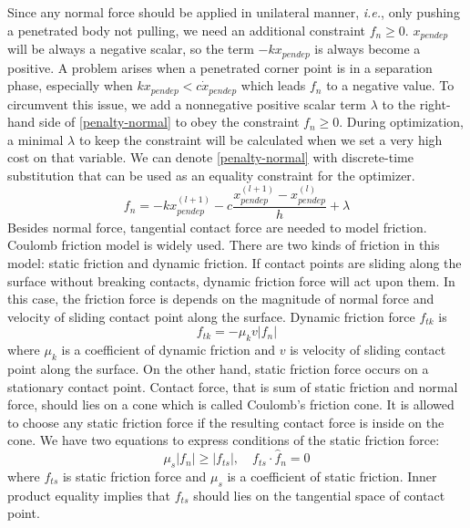 \documentclass{acm_proc_article-sp}
\begin{document}
Since any normal force should be applied in unilateral manner, \emph{i.e.},
only pushing a penetrated body not pulling, we need an additional constraint $f_n \geq 0$.
$x_{pendep}$ will be always a negative scalar, so the term $-kx_{pendep}$ is always become a positive.
A problem arises when a penetrated corner point is in a separation phase,
especially when $kx_{pendep} < c\dot{x}_{pendep}$ which leads $f_n$ to a negative value.
To circumvent this issue, we add a nonnegative positive scalar term $\lambda$ to the right-hand side
of \eqref{penalty-normal} to obey the constraint $f_n \geq 0$. During optimization,
a minimal $\lambda$ to keep the constraint will be calculated
when we set a very high cost on that variable. We can denote \eqref{penalty-normal} with
discrete-time substitution that can be used as an equality constraint for the optimizer.
\begin{equation}\label{penalty-normal-discretized}
f_n = -k x_{pendep}^{(l+1)} - c \frac{x_{pendep}^{(l+1)} - x_{pendep}^{(l)}}{h} + \lambda
\end{equation}
Besides normal force, tangential contact force are needed to model friction.
Coulomb friction model is widely used.
There are two kinds of friction in this model: static friction and dynamic friction.
If contact points are sliding along the surface without breaking contacts,
dynamic friction force will act upon them. In this case, the friction force is depends
on the magnitude of normal force and velocity of sliding contact point along the surface.
Dynamic friction force $f_{tk}$ is
\begin{equation}\label{dynamic-friction}
f_{tk} = -\mu_k v |f_n|
\end{equation}
where $\mu_k$ is a coefficient of dynamic friction
and $v$ is velocity of sliding contact point along the surface.
On the other hand, static friction force occurs on a stationary contact point.
Contact force, that is sum of static friction and normal force, should lies on a cone
which is called Coulomb's friction cone.
It is allowed to choose any static friction force if the resulting contact force is
inside on the cone. We have two equations to express conditions of the static friction force:
\begin{equation}\label{static-friction}
\mu_s |f_n| \geq |f_{ts}|, \quad f_{ts} \cdot \hat{f}_n = 0
\end{equation}
where $f_{ts}$ is static friction force and $\mu_s$ is a coefficient of static friction.
Inner product equality implies that $f_{ts}$ should lies on the tangential space of contact point.
\end{document}
